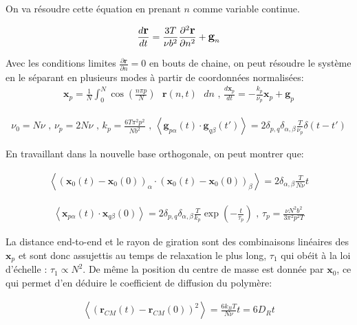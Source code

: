 On va résoudre cette équation en prenant $n$ comme variable continue.

\begin{eqnarray}
\large{
\frac{d \textbf{r}}{dt} =  \frac{3T}{\nu b^2}\frac{\partial ^2 \textbf{r}}{\partial  n^2} + \textbf{g}_n}
\end{eqnarray}

Avec les conditions limites $\frac{\partial  \textbf{r}}{\partial  n}=0$ en bouts de chaine, on peut résoudre le système en le séparant en plusieurs modes à  partir de coordonnées normalisées: 
\begin{eqnarray}
\textbf{x}_p= \frac{1}{N} \int_0^N \cos \left(\frac{n\pi p}{N}\right) \text{ }\textbf{r}(n,t)\text{ } dn \text{ , } \frac{d \textbf{x}_p}{dt} =  -\frac{k_p}{\nu _p} \textbf{x}_p + \textbf{g}_p
\end{eqnarray}



\begin{eqnarray}
\nu_0=  N \nu \text{ , } \nu_p= 2 N \nu  \text{ , }  k_p=\frac{6T\pi^2 p^2}{N b^2}  \text{ , }  \left<\textbf{g}_{p\alpha}(t) \cdot \textbf{g}_{q\beta}(t')\right> = 2\delta_{p,q} \delta_{\alpha ,\beta} \frac{T}{\nu_p} \delta(t-t')
\end{eqnarray}

En travaillant dans la nouvelle base orthogonale, on peut montrer que:


\begin{eqnarray}
\left<(\textbf{x}_{0}(t)-\textbf{x}_{0}(0))_\alpha \cdot (\textbf{x}_{0}(t)-\textbf{x}_{0}(0))_\beta \right> = 2 \delta_{\alpha ,\beta} \frac{T}{N\nu}t
\end{eqnarray}

\begin{eqnarray}
\left<\textbf{x}_{p\alpha}(t) \cdot \textbf{x}_{q\beta}(0)\right> = 2\delta_{p,q} \delta_{\alpha ,\beta} \frac{T}{k_p} \exp\left(-\frac{t}{\tau_p}\right) \text{ , } \tau _p = \frac{\nu N^2 b^2}{3\pi^2p^2T}
\end{eqnarray}

La distance end-to-end et le rayon de giration sont des combinaisons linéaires des $\textbf{x}_p$ et sont donc assujettis  au temps de relaxation le plus long, $\tau_1$ qui obéit à la loi d'échelle : $\tau_1 \propto N^2$. De même la position du centre de masse est donnée par $\textbf{x}_0$, ce qui permet d'en déduire le coefficient de diffusion du polymère:


\begin{eqnarray}
\left<(\textbf{r}_{CM}(t)-\textbf{r}_{CM}(0))^2\right>=\frac{6 k_B T}{N \nu} t = 6 D_R t
\label{fluctudissip}
\end{eqnarray}




